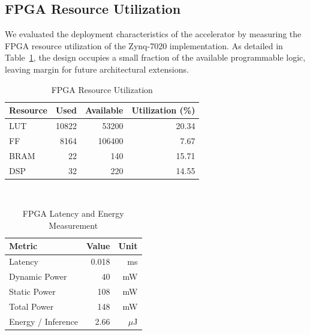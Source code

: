 \documentclass[12pt]{article}
\begin{document}
\begin{table}[h]
\centering
\caption{Ablation Study Results on the SEED Dataset.}
\label{tab:supp_ablation}
\footnotesize
\renewcommand{\arraystretch}{1.2}
\setlength{\tabcolsep}{2.5pt}
\end{table}

\subsection{FPGA Resource Utilization}

We evaluated the deployment characteristics of the accelerator by measuring the FPGA resource utilization of the Zynq-7020 implementation. As detailed in Table~\ref{tab:fpga_resource}, the design occupies a small fraction of the available programmable logic, leaving margin for future architectural extensions.

\begin{table}[!htbp]
\centering
\caption{FPGA Resource Utilization}
\label{tab:fpga_resource}
\footnotesize
\renewcommand{\arraystretch}{1.2}
\setlength{\tabcolsep}{4pt}
\begin{tabular}{@{}lrrr@{}}
\toprule
Resource & Used & Available & Utilization (\%) \\
\midrule
LUT & 10822 & 53200 & 20.34 \\
FF & 8164 & 106400 & 7.67 \\
BRAM & 22 & 140 & 15.71 \\
DSP & 32 & 220 & 14.55 \\
\bottomrule
\end{tabular}
\end{table}

\begin{table}[!htbp]
\centering
\caption{FPGA Latency and Energy Measurement}
\label{tab:power_comparison}  
\footnotesize
\renewcommand{\arraystretch}{1.2}
\setlength{\tabcolsep}{4pt}
\begin{tabular}{@{}lrr@{}}
\toprule
\textbf{Metric} & \textbf{Value} & \textbf{Unit} \\
\midrule
Latency & 0.018 & ms \\
Dynamic Power & 40 & mW \\
Static Power & 108 & mW \\
Total Power & 148 & mW \\
Energy / Inference & 2.66 & $\mu$J \\
\bottomrule
\end{tabular}
\end{table}
\end{document}
